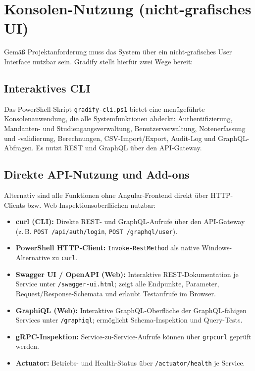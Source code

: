 \documentclass[12pt,a4paper,ngerman]{article}
\begin{document}
\section{Konsolen-Nutzung (nicht-grafisches UI)}

Gemäß Projektanforderung muss das System über ein nicht-grafisches User Interface nutzbar sein. Gradify stellt hierfür zwei Wege bereit:

\subsection{Interaktives CLI}

Das PowerShell-Skript \texttt{gradify-cli.ps1} bietet eine menügeführte Konsolenanwendung, die alle Systemfunktionen abdeckt: Authentifizierung, Mandanten- und Studiengangsverwaltung, Benutzerverwaltung, Notenerfassung und -validierung, Berechnungen, CSV-Import/Export, Audit-Log und GraphQL-Abfragen. Es nutzt REST und GraphQL über den API-Gateway.

\subsection{Direkte API-Nutzung und Add-ons}

Alternativ sind alle Funktionen ohne Angular-Frontend direkt über HTTP-Clients bzw. Web-Inspektionsoberflächen nutzbar:

\begin{itemize}[nosep]
\item \textbf{curl (CLI):} Direkte REST- und GraphQL-Aufrufe über den API-Gateway (z.\,B. \texttt{POST /api/auth/login}, \texttt{POST /graphql/user}).
\item \textbf{PowerShell HTTP-Client:} \texttt{Invoke-RestMethod} als native Windows-Alternative zu \texttt{curl}.
\item \textbf{Swagger UI / OpenAPI (Web):} Interaktive REST-Dokumentation je Service unter \texttt{/swagger-ui.html}; zeigt alle Endpunkte, Parameter, Request/Response-Schemata und erlaubt Testaufrufe im Browser.
\item \textbf{GraphiQL (Web):} Interaktive GraphQL-Oberfläche der GraphQL-fähigen Services unter \texttt{/graphiql}; ermöglicht Schema-Inspektion und Query-Tests.
\item \textbf{gRPC-Inspektion:} Service-zu-Service-Aufrufe können über \texttt{grpcurl} geprüft werden.
\item \textbf{Actuator:} Betriebs- und Health-Status über \texttt{/actuator/health} je Service.
\end{itemize}
\end{document}
